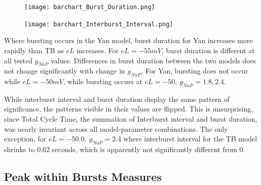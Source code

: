 \documentclass[11pt]{article}
\begin{document}
\begin{figure}
	\centering
	\texttt{[image: barchart\_Burst\_Duration.png]}
\end{figure}

  \begin{figure}
	\centering
	\texttt{[image: barchart\_Interburst\_Interval.png]}
\end{figure} 
   


Where bursting occurs in the Yan model, burst duration for Yan increases more rapidly than TB as $eL$ increases. For $eL=-55 mV$, burst duration is different at all tested $g_{NaP}$ values.
Differences in burst duration between the two models does not change significantly with change in $g_{NaP}$. For Yan, bursting does not occur while $eL = -50 mV$, while bursting occurs at $eL=-50,\  g_{NaP}=1.8, 2.4$. 


While interburst interval and burst duration display the same pattern of significance, the patterns visible in their values are flipped. This is unsurprising, since Total Cycle Time, the summation of Interburst interval and burst duration, was nearly invariant across all model-parameter combinations. The only exception, for $eL=-50.0,\ g_{NaP} = 2.4$ where interburst interval for the TB model shrinks to 0.62 seconds, which is apparently not significantly different from 0.



\subsection{Peak within Bursts Measures}
\end{document}
